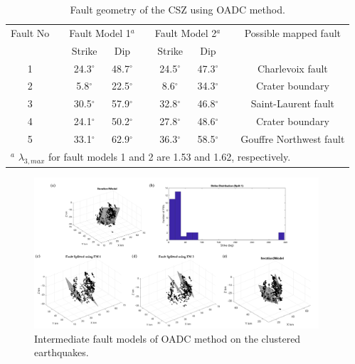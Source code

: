 \documentclass[draft]{agujournal2018}
\begin{document}
    \begin{table}
    \caption{Fault geometry of the CSZ using OADC method.}
    \centering
    \begin{tabular}{ccccccccc}
    \hline
    Fault No &   & \multicolumn{2}{c}{Fault Model 1$^{a}$} & &  \multicolumn{2}{c}{Fault Model 2$^{a}$} &   &Possible mapped fault \\
    & & Strike & Dip  & & Strike & Dip & & \\
    \hline
    1 & &24.3$^\circ$ & 48.7$^\circ$ &  &     24.5$^\circ$ & 47.3$^\circ$& &Charlevoix fault \\
    2 & &5.8$^\circ$ & 22.5$^\circ$ & 	&	8.6$^\circ$ & 34.3$^\circ$& &Crater boundary  \\
    3 & &30.5$^\circ$ & 57.9$^\circ$ & 	&	32.8$^\circ$ & 46.8$^\circ$&  &Saint-Laurent fault\\
    4 & &24.1$^\circ$ & 50.2$^\circ$ & 	&	27.8$^\circ$ & 48.6$^\circ$&  &Crater boundary \\
    5 & &33.1$^\circ$ & 62.9$^\circ$ & 	&	36.3$^\circ$ & 58.5$^\circ$&  &Gouffre Northwest fault\\
    \hline
    \multicolumn{9}{l}{$^{a}$ $\lambda_{3,max}$ for fault models 1 and 2 are 1.53 and 1.62, respectively.}
    \end{tabular}
    \label{tableone}
    \end{table}




\begin{figure}[ht]
\centering
\includegraphics[width=25pc]{Figures/OADC_fig_1.png}
\caption{Intermediate fault models of OADC method on the clustered earthquakes.}
\label{figsix}
\end{figure}
\end{document}

